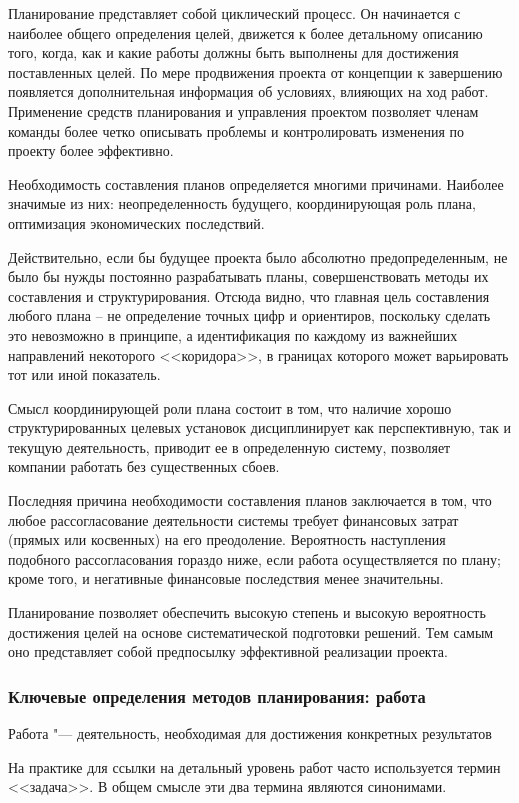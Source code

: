 \documentclass{../industrial-development}
\begin{document}
Планирование представляет собой циклический процесс. Он начинается с наиболее общего определения целей, движется к более детальному описанию того, когда, как и какие работы должны быть выполнены для достижения поставленных целей. По мере продвижения проекта от концепции к завершению появляется дополнительная информация об условиях, влияющих на ход работ. Применение средств планирования и управления проектом позволяет членам команды более четко описывать проблемы и контролировать изменения по проекту более эффективно.

Необходимость составления планов определяется многими причинами. Наиболее значимые из них: неопределенность будущего, координирующая роль плана, оптимизация экономических последствий.

Действительно, если бы будущее проекта было абсолютно предопределенным, не было бы нужды постоянно разрабатывать планы, совершенствовать методы их составления и структурирования. Отсюда видно, что главная цель составления любого плана – не определение точных цифр и ориентиров, поскольку сделать это невозможно в принципе, а идентификация по каждому из важнейших направлений некоторого <<коридора>>, в границах которого может варьировать тот или иной показатель.

Смысл координирующей роли плана состоит в том, что наличие хорошо структурированных целевых установок дисциплинирует как перспективную, так и текущую деятельность, приводит ее в определенную систему, позволяет компании работать без существенных сбоев.

Последняя причина необходимости составления планов заключается в том, что любое рассогласование деятельности системы требует финансовых затрат (прямых или косвенных) на его преодоление. Вероятность наступления подобного рассогласования гораздо ниже, если работа осуществляется по плану; кроме того, и негативные финансовые последствия менее значительны.

Планирование позволяет обеспечить высокую степень и высокую вероятность достижения целей на основе систематической подготовки решений. Тем самым оно представляет собой предпосылку эффективной реализации проекта.

    \begin{frame} \frametitle{Ключевые определения методов планирования: работа}
        \begin{definition}
            \alert{Работа} "--- деятельность, необходимая для достижения конкретных результатов
        \end{definition}
На практике для ссылки на детальный уровень работ часто используется термин <<задача>>. В общем смысле эти два термина являются синонимами.
    \end{frame}
    \lecturenotes
\end{document}

